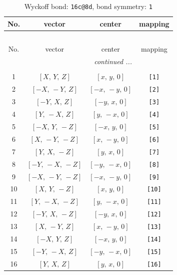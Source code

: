 \documentclass[fleqn,8pt]{jsarticle}
\begin{document}
\begin{longtable}{cccc}
\caption{Wyckoff bond: {\tt 16c@8d}, bond symmetry: {\tt 1}}
 \\
 \hline \hline
No. & vector & center & mapping \\ \hline \endfirsthead

\multicolumn{3}{l}{\tablename\ \thetable{}} \\
 \hline \hline
No. & vector & center & mapping \\ \hline \endhead

 \hline \hline
\multicolumn{3}{r}{\footnotesize\it continued ...} \\ \endfoot

 \hline \hline
\multicolumn{3}{r}{} \\ \endlastfoot

1 & $\left[ X,\, Y,\, Z \right]$ & $\left[ x,\, y,\, 0 \right]$ & {\tt [1]} \\ \hline
2 & $\left[ - X,\, - Y,\, Z \right]$ & $\left[ - x,\, - y,\, 0 \right]$ & {\tt [2]} \\ \hline
3 & $\left[ - Y,\, X,\, Z \right]$ & $\left[ - y,\, x,\, 0 \right]$ & {\tt [3]} \\ \hline
4 & $\left[ Y,\, - X,\, Z \right]$ & $\left[ y,\, - x,\, 0 \right]$ & {\tt [4]} \\ \hline
5 & $\left[ - X,\, Y,\, - Z \right]$ & $\left[ - x,\, y,\, 0 \right]$ & {\tt [5]} \\ \hline
6 & $\left[ X,\, - Y,\, - Z \right]$ & $\left[ x,\, - y,\, 0 \right]$ & {\tt [6]} \\ \hline
7 & $\left[ Y,\, X,\, - Z \right]$ & $\left[ y,\, x,\, 0 \right]$ & {\tt [7]} \\ \hline
8 & $\left[ - Y,\, - X,\, - Z \right]$ & $\left[ - y,\, - x,\, 0 \right]$ & {\tt [8]} \\ \hline
9 & $\left[ - X,\, - Y,\, - Z \right]$ & $\left[ - x,\, - y,\, 0 \right]$ & {\tt [9]} \\ \hline
10 & $\left[ X,\, Y,\, - Z \right]$ & $\left[ x,\, y,\, 0 \right]$ & {\tt [10]} \\ \hline
11 & $\left[ Y,\, - X,\, - Z \right]$ & $\left[ y,\, - x,\, 0 \right]$ & {\tt [11]} \\ \hline
12 & $\left[ - Y,\, X,\, - Z \right]$ & $\left[ - y,\, x,\, 0 \right]$ & {\tt [12]} \\ \hline
13 & $\left[ X,\, - Y,\, Z \right]$ & $\left[ x,\, - y,\, 0 \right]$ & {\tt [13]} \\ \hline
14 & $\left[ - X,\, Y,\, Z \right]$ & $\left[ - x,\, y,\, 0 \right]$ & {\tt [14]} \\ \hline
15 & $\left[ - Y,\, - X,\, Z \right]$ & $\left[ - y,\, - x,\, 0 \right]$ & {\tt [15]} \\ \hline
16 & $\left[ Y,\, X,\, Z \right]$ & $\left[ y,\, x,\, 0 \right]$ & {\tt [16]} \\
\end{longtable}
\end{document}
